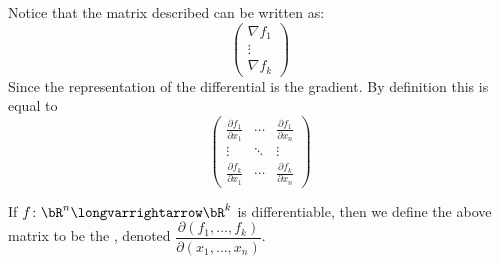 \documentclass[10pt]{article}
\begin{document}
Notice that the matrix described can be written as:
\[ \begin{pmatrix} \nabla f_1 \\ \vdots \\ \nabla f_k \end{pmatrix} \]
Since the representation of the differential is the gradient.
By definition this is equal to
\[ \begin{pmatrix} \frac{\partial f_1}{\partial x_1} & \cdots & \frac{\partial f_1}{\partial x_n} \\ \vdots & \ddots & \vdots \\
\frac{\partial f_k}{\partial x_1} & \cdots & \frac{\partial f_k}{\partial x_n} \end{pmatrix} \]


\begin{defn*}

    If $f\colon\bR^n\longvarrightarrow\bR^k$ is differentiable, then we define the above matrix to be the , denoted $\dfrac{\partial(f_1,\dots,f_k)}{\partial(x_1,\dots,x_n)}$.

\end{defn*}
\end{document}
